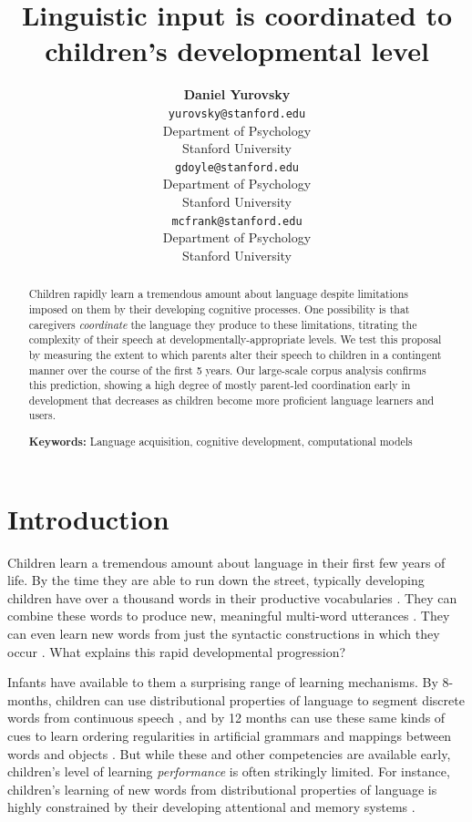 \documentclass[10pt,letterpaper]{article}
\title{Linguistic input is coordinated to children's developmental level}
\author{{\large \bf Daniel Yurovsky} \\ \texttt{yurovsky@stanford.edu}\\ Department of Psychology \\ Stanford University
 	\And {\large \bf Gabriel Doyle} \\ \texttt{gdoyle@stanford.edu} \\ Department of Psychology \\ Stanford University
	\And {\large \bf Michael C. Frank} \\ \texttt{mcfrank@stanford.edu} \\ Department of Psychology \\ Stanford University}
\begin{document}
\maketitle

\begin{abstract}

Children rapidly learn a tremendous amount about language despite limitations imposed on them by their developing cognitive processes. One possibility is that caregivers \emph{coordinate} the language they produce to these limitations, titrating the complexity of their speech at developmentally-appropriate levels. We test this proposal by measuring the extent to which parents alter their speech to children in a contingent manner over the course of the first 5 years. Our large-scale corpus analysis confirms this prediction, showing a high degree of mostly parent-led coordination early in development that decreases as children become more proficient language learners and users.

\textbf{Keywords:}
Language acquisition, cognitive development, computational models
\end{abstract}

\section{Introduction}

Children learn a tremendous amount about language in their first few years of life. By the time they are able to run down the street, typically developing children have over a thousand words in their productive vocabularies \cite{mayor2011}. They can combine these words to produce new, meaningful multi-word utterances \cite{lieven2009}. They can even learn new words from just the syntactic constructions in which they occur \cite{yuan2009}. What explains this rapid developmental progression?

Infants have available to them a surprising range of learning mechanisms. By 8-months, children can use distributional properties of language to segment discrete words from continuous speech \cite{saffran1996}, and by 12 months can use these same kinds of cues to learn ordering regularities in artificial grammars \cite{gomez1999} and mappings between words and objects \cite{smith2008}. But while these and other competencies are available early, children's level of learning \emph{performance} is often strikingly limited. For instance, children's learning of new words from distributional properties of language is highly constrained by their developing attentional and memory systems \cite{vlach2013}.
\end{document}

